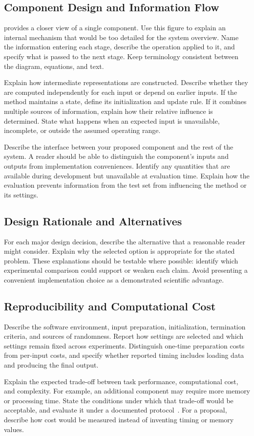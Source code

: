 \subsection{Component Design and Information Flow}
 provides a closer view of a single component.
Use this figure to explain an internal mechanism that would be too detailed
for the system overview. Name the information entering each stage, describe
the operation applied to it, and specify what is passed to the next stage.
Keep terminology consistent between the diagram, equations, and text.



Explain how intermediate representations are constructed. Describe whether
they are computed independently for each input or depend on earlier inputs.
If the method maintains a state, define its initialization and update rule.
If it combines multiple sources of information, explain how their relative
influence is determined. State what happens when an expected input is
unavailable, incomplete, or outside the assumed operating range.

Describe the interface between your proposed component and the rest of the
system. A reader should be able to distinguish the component's inputs and
outputs from implementation conveniences. Identify any quantities that are
available during development but unavailable at evaluation time. Explain
how the evaluation prevents information from the test set from influencing
the method or its settings.

\subsection{Design Rationale and Alternatives}
For each major design decision, describe the alternative that a reasonable
reader might consider. Explain why the selected option is appropriate for
the stated problem. These explanations should be testable where possible:
identify which experimental comparison could support or weaken each claim.
Avoid presenting a convenient implementation choice as a demonstrated
scientific advantage.

\subsection{Reproducibility and Computational Cost}
Describe the software environment, input preparation, initialization,
termination criteria, and sources of randomness. Report how settings are
selected and which settings remain fixed across experiments. Distinguish
one-time preparation costs from per-input costs, and specify whether
reported timing includes loading data and producing the final output.

Explain the expected trade-off between task performance, computational cost,
and complexity. For example, an additional component may require more memory
or processing time. State the conditions under which that trade-off would
be acceptable, and evaluate it under a documented protocol~\cite{reproducibility}.
For a proposal, describe how cost would be measured instead of inventing
timing or memory values.

